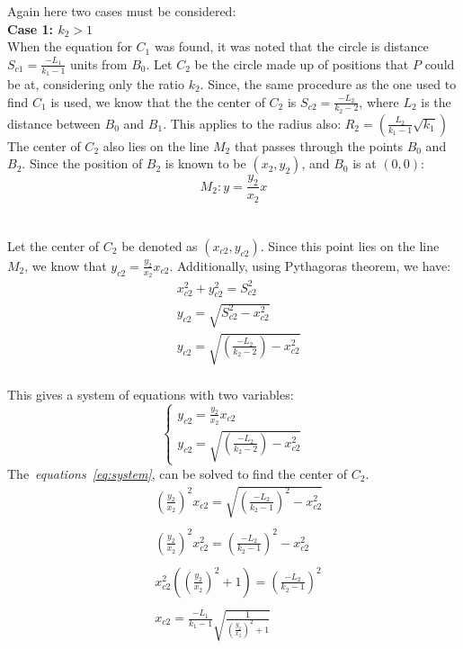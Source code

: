 \documentclass[a4paper,12pt]{article}
\begin{document}
\FloatBarrier{}
Again here two cases must be considered:\\
\textbf{Case 1: $k_2>1$}\\
When the equation for $C_1$ was found, it was noted that the circle is distance $S_{c1}=\frac{-L_1}{k_1-1}$ units from $B_0$. Let $C_2$ be the circle made up of positions that $P$ could be at, considering only the ratio $k_2$. 
Since, the same procedure as the one used to find $C_1$ is used, we know that the the center of $C_2$ is $S_{c2}=\frac{-L_2}{k_2-2}$, where $L_2$ is the distance between $B_0$ and $B_1$. This applies to the radius also: $R_2=\left(\frac{L_2}{k_1-1}\sqrt{k_1}\right)$
The center of $C_2$
also lies on the line $M_2$ that passes through the points $B_0$ and $B_2$. Since the position of $B_2$ is known to be $(x_2,y_2)$, and $B_0$ is at $(0,0)$:
\begin{equation*}
    M_2: y=\frac{y_2}{x_2}x
\end{equation*}
\\\\
Let the center of $C_2$ be denoted as $(x_{c2},y_{c2})$. Since this point lies on the line $M_2$, we know that $y_{c2}=\frac{y_2}{x_2}x_{c2}$.
Additionally, using Pythagoras theorem, we have:
\begin{equation*}
    \begin{split}
        &x_{c2}^2 + y_{c2}^2 = S_{c2}^2\\
        &y_{c2} = \sqrt{ S_{c2}^2 - x_{c2}^2}\\
        &y_{c2} = \sqrt{\left(\frac{-L_2}{k_2-2}\right) - x_{c2}^2}\\
    \end{split}
\end{equation*}

This gives a system of equations with two variables:
\begin{equation}
    \begin{cases}
        y_{c2}=\frac{y_2}{x_2}x_{c2}\\ 
        y_{c2} = \sqrt{\left(\frac{-L_2}{k_2-2}\right) - x_{c2}^2}
    \end{cases}
\label{eq:system}
\end{equation}
\FloatBarrier{}
The~\textit{equations~\ref{eq:system}}, can be solved to find the center of $C_2$.
\begin{equation*}
    \begin{split}
        &\left(\frac{y_2}{x_2}\right)^2x_{c2} = \sqrt{\left(\frac{-L_2}{k_2-1}\right)^2 - x_{c2}^2}\\\\
        &\left(\frac{y_2}{x_2}\right)^2x_{c2}^2 = \left(\frac{-L_2}{k_2-1}\right)^2 - x_{c2}^2\\\\
        &x_{c2}^2\left(\left(\frac{y_2}{x_2}\right)^2+1\right) = \left(\frac{-L_2}{k_2-1}\right)^2\\\\
        &x_{c2} = \frac{-L_1}{k_1-1}\sqrt{\frac{1}{\left(\frac{y_2}{x_2}\right)^2+1}}\\\\
    \end{split}
\end{equation*}
\end{document}
